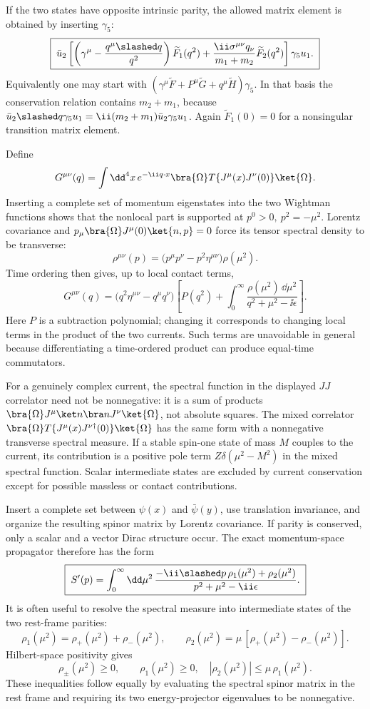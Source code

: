 \begin{enumerate}
If the two states have opposite intrinsic parity, the allowed matrix
element is obtained by inserting \(\gamma_5\):
\[
 \boxed{\;
 \bar u_2\left[
 \left(\gamma^\mu-\frac{q^\mu\slashed q}{q^2}\right)
 \widetilde F_1(q^2)
 +\frac{\ii\sigma^{\mu\nu}q_\nu}{m_1+m_2}
 \widetilde F_2(q^2)
 \right]\gamma_5u_1.\;}
\]
Equivalently one may start with
\((\gamma^\mu\widetilde F+P^\mu\widetilde G+
q^\mu\widetilde H)\gamma_5\).  In that basis the conservation relation
contains \(m_2+m_1\), because
\(\bar u_2\slashed q\gamma_5u_1
=\ii(m_2+m_1)\bar u_2\gamma_5u_1\).  Again
\(\widetilde F_1(0)=0\) for a nonsingular transition matrix element.

Define
\[
 G^{\mu\nu}(q)=\int \dd^4x\,e^{-\ii q\cdot x}
 \bra{\Omega}T\{J^\mu(x)J^\nu(0)\}\ket{\Omega}.
\]
Inserting a complete set of momentum eigenstates into the two Wightman
functions shows that the nonlocal part is supported at
\(p^0>0,\ p^2=-\mu^2\).  Lorentz covariance and
\(p_\mu\bra{\Omega}J^\mu(0)\ket{n,p}=0\) force its tensor spectral
density to be transverse:
\[
 \rho^{\mu\nu}(p)
 =\bigl(p^\mu p^\nu-p^2\eta^{\mu\nu}\bigr)\rho(\mu^2).
\]
Time ordering then gives, up to local contact terms,
\[
 \boxed{\;
 G^{\mu\nu}(q)
 =\bigl(q^2\eta^{\mu\nu}-q^\mu q^\nu\bigr)
 \left[
 P(q^2)+\int_0^\infty
 \frac{\rho(\mu^2)\,\dd\mu^2}
 {q^2+\mu^2-\ii\epsilon}
 \right].\;}
\]
Here \(P\) is a subtraction polynomial; changing it corresponds to
changing local terms in the product of the two currents.  Such terms are
unavoidable in general because differentiating a time-ordered product can
produce equal-time commutators.

For a genuinely complex current, the spectral function in the displayed
\(JJ\) correlator need not be nonnegative: it is a sum of products
\(\bra{\Omega}J^\mu\ket n\bra nJ^\nu\ket{\Omega}\), not absolute
squares.  The mixed correlator
\(\bra{\Omega}T\{J^\mu(x)J^{\nu\dagger}(0)\}\ket{\Omega}\) has the same
form with a nonnegative transverse spectral measure.  If a stable
spin-one state of mass \(M\) couples to the current, its contribution is
a positive pole term \(Z\delta(\mu^2-M^2)\) in the mixed spectral
function.  Scalar intermediate states are excluded by current
conservation except for possible massless or contact contributions.

Insert a complete set between \(\psi(x)\) and \(\bar\psi(y)\), use
translation invariance, and organize the resulting spinor matrix by
Lorentz covariance.  If parity is conserved, only a scalar and a vector
Dirac structure occur.  The exact momentum-space propagator therefore has
the form
\[
 \boxed{\;
 S'(p)=\int_0^\infty \dd\mu^2\,
 \frac{-\ii\slashed p\,\rho_1(\mu^2)+\rho_2(\mu^2)}
 {p^2+\mu^2-\ii\epsilon}.\;}
\]
It is often useful to resolve the spectral measure into intermediate
states of the two rest-frame parities:
\[
 \rho_1(\mu^2)=\rho_+(\mu^2)+\rho_-(\mu^2),\qquad
 \rho_2(\mu^2)=\mu\,[\rho_+(\mu^2)-\rho_-(\mu^2)].
\]
Hilbert-space positivity gives
\[
 \rho_\pm(\mu^2)\geq0,
\qquad
 \boxed{\rho_1(\mu^2)\geq0,\quad
 |\rho_2(\mu^2)|\leq\mu\,\rho_1(\mu^2).}
\]
These inequalities follow equally by evaluating the spectral spinor
matrix in the rest frame and requiring its two energy-projector
eigenvalues to be nonnegative.


\end{enumerate}
